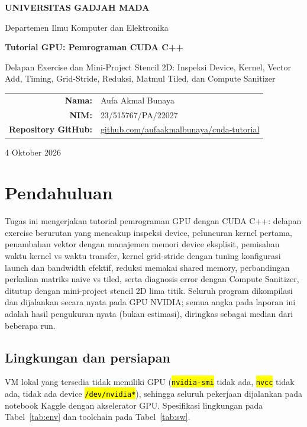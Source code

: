 \documentclass[11pt,a4paper]{article}
\newcommand{\cmd}[1]{\hl{\texttt{#1}}}
\begin{document}
\begin{titlepage}
\centering
\vspace*{1.3cm}
{\Large\bfseries UNIVERSITAS GADJAH MADA\par}
\vspace{0.4cm}
{\large Departemen Ilmu Komputer dan Elektronika\par}
\vspace{2.0cm}
{\Huge\bfseries Tutorial GPU: Pemrograman CUDA C++\par}
\vspace{0.5cm}
{\large Delapan Exercise dan Mini-Project Stencil 2D: Inspeksi Device, Kernel, Vector Add, Timing, Grid-Stride, Reduksi, Matmul Tiled, dan Compute Sanitizer\par}
\vfill
\begin{tabular}{>{\bfseries}rl}
Nama: & Aufa Akmal Bunaya\\
NIM: & 23/515767/PA/22027\\
Repository GitHub: & \href{https://github.com/aufaakmalbunaya/cuda-tutorial}{github.com/aufaakmalbunaya/cuda-tutorial}
\end{tabular}
\vfill
{\large 4 Oktober 2026\par}
\end{titlepage}

\tableofcontents
\newpage

\section{Pendahuluan}
Tugas ini mengerjakan tutorial pemrograman GPU dengan CUDA C++: delapan exercise berurutan yang mencakup inspeksi device, peluncuran kernel pertama, penambahan vektor dengan manajemen memori device eksplisit, pemisahan waktu kernel vs waktu transfer, kernel grid-stride dengan tuning konfigurasi launch dan bandwidth efektif, reduksi memakai shared memory, perbandingan perkalian matriks naive vs tiled, serta diagnosis error dengan Compute Sanitizer, ditutup dengan mini-project stencil 2D lima titik. Seluruh program dikompilasi dan dijalankan secara nyata pada GPU NVIDIA; semua angka pada laporan ini adalah hasil pengukuran nyata (bukan estimasi), diringkas sebagai median dari beberapa run.

\subsection{Lingkungan dan persiapan}
VM lokal yang tersedia tidak memiliki GPU (\cmd{nvidia-smi} tidak ada, \cmd{nvcc} tidak ada, tidak ada device \cmd{/dev/nvidia*}), sehingga seluruh pekerjaan dijalankan pada notebook Kaggle dengan akselerator GPU. Spesifikasi lingkungan pada Tabel~\ref{tab:env} dan toolchain pada Tabel~\ref{tab:sw}.
\end{document}
